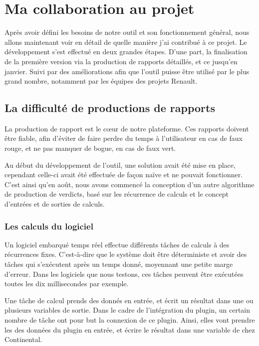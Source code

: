 \chapter{Ma collaboration au projet}\label{collab}
\putminitoc
Après avoir défini les besoins de notre outil et son fonctionnement général, nous allons maintenant voir en détail de quelle manière j'ai contribué à ce projet. Le développement s'est effectué en deux grandes étapes. D'une part, la finalisation de la première version via la production de rapports détaillés, et ce jusqu'en janvier. Suivi par des améliorations afin que l'outil puisse être utilisé par le plus grand nombre, notamment par les équipes des projets Renault. 

\section{La difficulté de productions de rapports}
La production de rapport est le cœur de notre plateforme. Ces rapports doivent être fiable, afin d'éviter de faire perdre du temps à l'utilisateur en cas de faux rouge, et ne pas manquer de bogue, en cas de faux vert. 

Au début du développement de l'outil, une solution avait été mise en place, cependant celle-ci avait été effectuée de façon naïve et ne pouvait fonctionner. C'est ainsi qu'en août, nous avons commencé la conception d'un autre algorithme de production de verdicts, basé sur les récurrence de calculs et le concept d'entrées et de sorties de calculs. 

\subsection{Les calculs du logiciel}
	Un logiciel embarqué temps réel effectue différents tâches de calculs à des récurrences fixes. C'est-à-dire que le système doit être déterministe et avoir des tâches qui s'exécutent après un temps donné, moyennant une petite marge d'erreur. Dans les logiciels que nous testons, ces tâches peuvent être exécutées toutes les dix millisecondes par exemple. 
	
	Une tâche de calcul prends des donnés en entrée, et écrit un résultat dans une ou plusieurs variables de sortie. Dans le cadre de l'intégration du plugin, un certain nombre de tâche ont pour but la connexion de ce plugin. Ainsi, elles vont prendre les des données du plugin en entrée, et écrire le résultat dans une variable de chez Continental. 

